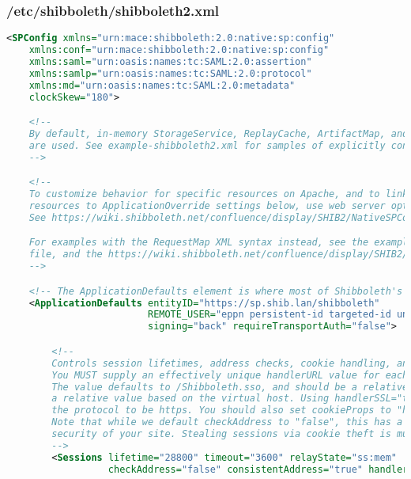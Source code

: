 \subsubsection{/etc/shibboleth/shibboleth2.xml}
\begin{lstlisting}[language=xml]
<SPConfig xmlns="urn:mace:shibboleth:2.0:native:sp:config"
    xmlns:conf="urn:mace:shibboleth:2.0:native:sp:config"
    xmlns:saml="urn:oasis:names:tc:SAML:2.0:assertion"
    xmlns:samlp="urn:oasis:names:tc:SAML:2.0:protocol"
    xmlns:md="urn:oasis:names:tc:SAML:2.0:metadata"
    clockSkew="180">

    <!--
    By default, in-memory StorageService, ReplayCache, ArtifactMap, and SessionCache
    are used. See example-shibboleth2.xml for samples of explicitly configuring them.
    -->

    <!--
    To customize behavior for specific resources on Apache, and to link vhosts or
    resources to ApplicationOverride settings below, use web server options/commands.
    See https://wiki.shibboleth.net/confluence/display/SHIB2/NativeSPConfigurationElements for help.

    For examples with the RequestMap XML syntax instead, see the example-shibboleth2.xml
    file, and the https://wiki.shibboleth.net/confluence/display/SHIB2/NativeSPRequestMapHowTo topic.
    -->

    <!-- The ApplicationDefaults element is where most of Shibboleth's SAML bits are defined. -->
    <ApplicationDefaults entityID="https://sp.shib.lan/shibboleth"
                         REMOTE_USER="eppn persistent-id targeted-id uniqueID"
                         signing="back" requireTransportAuth="false">

        <!--
        Controls session lifetimes, address checks, cookie handling, and the protocol handlers.
        You MUST supply an effectively unique handlerURL value for each of your applications.
        The value defaults to /Shibboleth.sso, and should be a relative path, with the SP computing
        a relative value based on the virtual host. Using handlerSSL="true", the default, will force
        the protocol to be https. You should also set cookieProps to "https" for SSL-only sites.
        Note that while we default checkAddress to "false", this has a negative impact on the
        security of your site. Stealing sessions via cookie theft is much easier with this disabled.
        -->
        <Sessions lifetime="28800" timeout="3600" relayState="ss:mem"
                  checkAddress="false" consistentAddress="true" handlerSSL="true" cookieProps="https">


\end{lstlisting}
